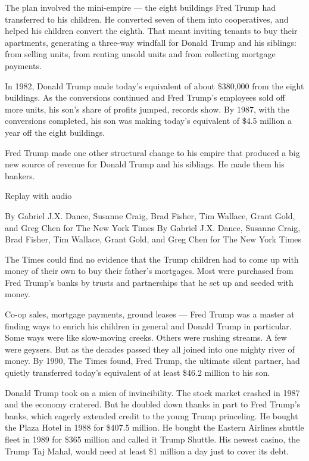 The plan involved the mini-empire --- the eight buildings Fred Trump had
transferred to his children. He converted seven of them into
cooperatives, and helped his children convert the eighth. That meant
inviting tenants to buy their apartments, generating a three-way
windfall for Donald Trump and his siblings: from selling units, from
renting unsold units and from collecting mortgage payments.

In 1982, Donald Trump made today's equivalent of about \$380,000 from
the eight buildings. As the conversions continued and Fred Trump's
employees sold off more units, his son's share of profits jumped,
records show. By 1987, with the conversions completed, his son was
making today's equivalent of \$4.5 million a year off the eight
buildings.

Fred Trump made one other structural change to his empire that produced
a big new source of revenue for Donald Trump and his siblings. He made
them his bankers.

Replay with audio

By Gabriel J.X. Dance, Susanne Craig, Brad Fisher, Tim Wallace, Grant
Gold, and Greg Chen for The New York Times By Gabriel J.X. Dance,
Susanne Craig, Brad Fisher, Tim Wallace, Grant Gold, and Greg Chen for
The New York Times

The Times could find no evidence that the Trump children had to come up
with money of their own to buy their father's mortgages. Most were
purchased from Fred Trump's banks by trusts and partnerships that he set
up and seeded with money.

Co-op sales, mortgage payments, ground leases --- Fred Trump was a
master at finding ways to enrich his children in general and Donald
Trump in particular. Some ways were like slow-moving creeks. Others were
rushing streams. A few were geysers. But as the decades passed they all
joined into one mighty river of money. By 1990, The Times found, Fred
Trump, the ultimate silent partner, had quietly transferred today's
equivalent of at least \$46.2 million to his son.

Donald Trump took on a mien of invincibility. The stock market crashed
in 1987 and the economy cratered. But he doubled down thanks in part to
Fred Trump's banks, which eagerly extended credit to the young Trump
princeling. He bought the Plaza Hotel in 1988 for \$407.5 million. He
bought the Eastern Airlines shuttle fleet in 1989 for \$365 million and
called it Trump Shuttle. His newest casino, the Trump Taj Mahal, would
need at least \$1 million a day just to cover its debt.

